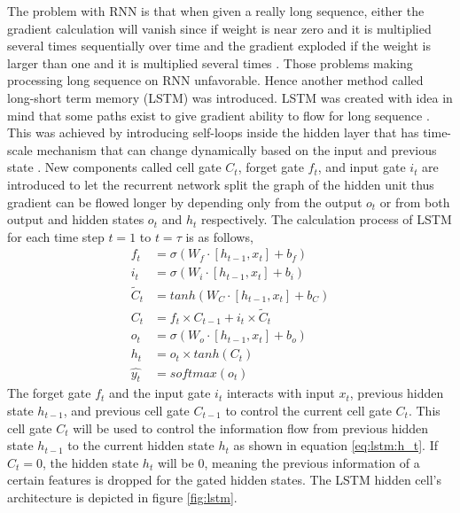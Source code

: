     The problem with RNN is that when given a really long sequence,
    either the gradient calculation will vanish since if weight is
    near zero and it is multiplied several times sequentially over
    time and the gradient exploded if the weight is larger than one
    and it is multiplied several times \citep{Goodfellow-et-al-2016}.
    Those problems making processing long sequence on RNN unfavorable.
    Hence another method called long-short term memory (LSTM) was
    introduced. LSTM was created with idea in mind that some paths
    exist to give gradient ability to flow for long sequence
    \citep{Goodfellow-et-al-2016}. This was achieved by introducing
    self-loops inside the hidden layer that has time-scale mechanism
    that can change dynamically based on the input and previous state
    \citep{Goodfellow-et-al-2016}. New components called cell gate
    $C_t$, forget gate $f_t$, and input gate $i_t$ are introduced to
    let the recurrent network split the graph of the hidden unit thus
    gradient can be flowed longer by depending only from the output
    $o_t$ or from both output and hidden states $o_t$ and $h_t$
    respectively. The calculation process of LSTM for each time step
    $t=1$ to $t=\tau$ is as follows,
    \begin{align}
        \label{eq:lstm:f_t}
        f_t &= \sigma(W_f \cdot [h_{t-1}, x_t] + b_f) \\
        \label{eq:lstm:i_t}    
        i_t &= \sigma(W_i \cdot [h_{t-1}, x_t] + b_i) \\
        \label{eq:lstm:Cc_t}
        \tilde{C}_t &= tanh(W_C \cdot [h_{t-1}, x_t] + b_C) \\
        \label{eq:lstm:C_t}
        C_t &= f_t \times C_{t-1} + i_t \times \tilde{C}_t \\
        \label{eq:lstm:o_t}
        o_t &= \sigma(W_o \cdot [h_{t-1}, x_t] + b_o) \\
        \label{eq:lstm:h_t}
        h_t &= o_t \times tanh(C_t) \\
        \label{eq:lstm:y_t}
        \hat{y_t} &= softmax(o_t)
    \end{align}
    The forget gate $f_t$ and the input gate $i_t$ interacts with
    input $x_t$, previous hidden state $h_{t-1}$, and previous cell
    gate $C_{t-1}$ to control the current cell gate $C_t$. This cell
    gate $C_t$ will be used to control the information flow from
    previous hidden state $h_{t-1}$ to the current hidden state $h_t$
    as shown in equation \ref{eq:lstm:h_t}. If $C_t = 0$, the hidden
    state $h_t$ will be $0$, meaning the previous information of a
    certain features is dropped for the gated hidden states. The LSTM
    hidden cell's architecture is depicted in figure \ref{fig:lstm}.

